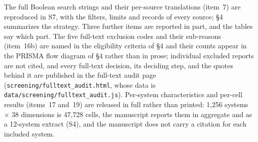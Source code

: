 The full Boolean search strings and their per-source translations (item~7) are reproduced in S7,
with the filters, limits and records of every source; \S4 summarizes the strategy.
Three further items are reported in part, and the tables say which part. The five full-text exclusion codes and their
sub-reasons (item~16b) are named in the eligibility criteria of \S4 and their counts appear in
the PRISMA flow diagram of \S4 rather than in prose; individual excluded reports are not cited, and
every full-text decision, its deciding step, and the quotes behind it are published in the full-text
audit page (\texttt{screening/fulltext\_audit.html}, whose data is
\texttt{data/screening/fulltext\_audit.js}). Per-system characteristics and per-cell results
(items~17 and~19) are released in full rather than printed: 1,256 systems $\times$ 38 dimensions is
47,728 cells, the manuscript reports them in aggregate and as a 12-system extract (S4), and the
manuscript does not carry a citation for each included system.

